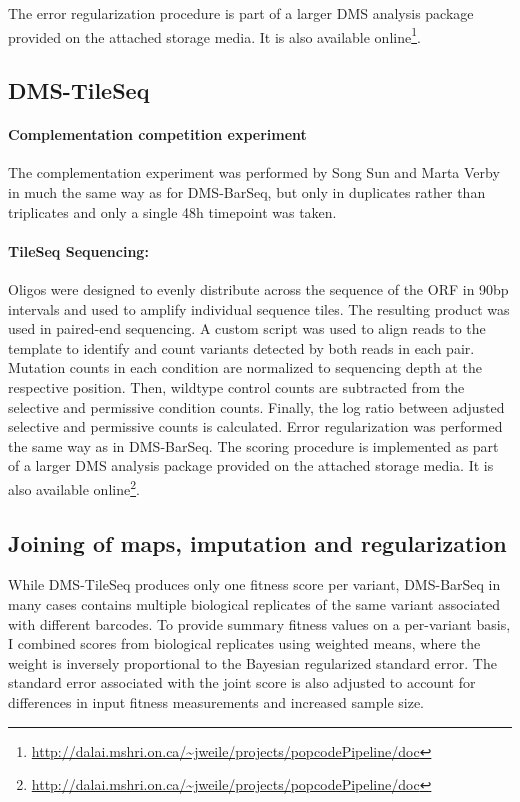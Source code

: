 The error regularization procedure is part of a larger DMS analysis package provided on the attached storage media. It is also available online\footnote{\url{http://dalai.mshri.on.ca/~jweile/projects/popcodePipeline/doc}}.


\subsection{DMS-TileSeq}

\paragraph{Complementation competition experiment} 
The complementation experiment was performed by Song Sun and Marta Verby in much the same way as for DMS-BarSeq, but only in duplicates rather than triplicates and only a single 48h timepoint was taken.

\paragraph{TileSeq Sequencing:} Oligos were designed to evenly distribute across the sequence of the  ORF in 90bp intervals and used to amplify individual sequence tiles. The resulting product was used in paired-end sequencing. A custom script was used to align reads to the  template to identify and count variants detected by both reads in each pair. Mutation counts in each condition are normalized to sequencing depth at the respective position. Then, wildtype control counts are subtracted from the selective and permissive condition counts. Finally, the log ratio between adjusted selective and permissive counts is calculated. Error regularization was performed the same way as in DMS-BarSeq. 
The scoring procedure is implemented as part of a larger DMS analysis package provided on the attached storage media. It is also available online\footnote{\url{http://dalai.mshri.on.ca/~jweile/projects/popcodePipeline/doc}}.

\subsection{Joining of maps, imputation and regularization}

While DMS-TileSeq produces only one fitness score per variant, DMS-BarSeq in many cases contains multiple biological replicates of the same variant associated with different barcodes. To provide summary fitness values on a per-variant basis, I combined scores from biological replicates using weighted means, where the weight is inversely proportional to the Bayesian regularized standard error. The standard error associated with the joint score is also adjusted to account for differences in input fitness measurements and increased sample size.

